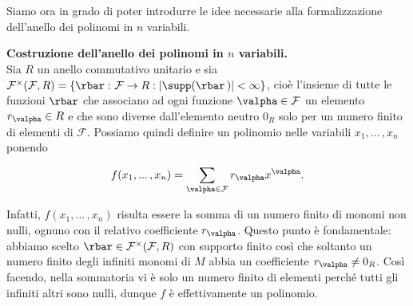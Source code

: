
\noindent Siamo ora in grado di poter introdurre le idee necessarie alla formalizzazione dell'anello dei polinomi in $n$ variabili.

\clearpage

\noindent \textbf{Costruzione dell'anello dei polinomi in $n$ variabili.}\\

\noindent Sia $R$ un anello commutativo unitario e sia 
$\mathcal{F}^{\times}(\mathcal{F},R)=\left\{ \rbar\,\colon \mathcal{F}\to R : |\supp(\rbar\,)|<\infty \right\}$\footnotemark, 
cioè l'insieme di tutte le funzioni $\rbar$ che associano ad ogni funzione $\valpha\in\mathcal{F}$ un elemento $r_{\valpha}\in R$ 
e che sono diverse dall'elemento neutro $0_R$ solo per un numero finito di elementi di $\mathcal{F}$. 
Possiamo quindi definire un polinomio nelle variabili $x_1,...\,,x_n$ ponendo 

\[ f(x_1,...\,,x_n)=\sum\limits_{\valpha\in \mathcal{F}}r_{\valpha} x^{\valpha}. \] 

\noindent Infatti, $f(x_1,...\,,x_n)$ risulta essere la somma di un numero finito di monomi non nulli, 
ognuno con il relativo coefficiente $r_{\valpha}$. Questo punto è fondamentale: abbiamo scelto $\rbar \in \mathcal{F}^{\times}(\mathcal{F},R)$ 
con supporto finito così che soltanto un numero finito degli infiniti monomi di $M$ abbia un coefficiente $r_{\valpha}\neq 0_R$. 
Così facendo, nella sommatoria vi è solo un numero finito di elementi perché tutti gli infiniti altri sono nulli, 
dunque $f$ è effettivamente un polinomio.


